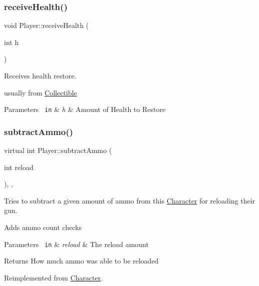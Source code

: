 \subsubsection{\texorpdfstring{receiveHealth()}{receiveHealth()}}
{\footnotesize\ttfamily void Player\+::receive\+Health (\begin{DoxyParamCaption}\item[{int}]{h }\end{DoxyParamCaption})}



Receives health restore. 

usually from \mbox{\hyperlink{class_collectible}{Collectible}}


\begin{DoxyParams}[1]{Parameters}
\mbox{\texttt{ in}}  & {\em h} & Amount of Health to Restore \\
\hline
\end{DoxyParams}
\mbox{\label{class_player_aeadfd36dc48aea300e4925b8c8f3bd3f}} 
\subsubsection{\texorpdfstring{subtractAmmo()}{subtractAmmo()}}
{\footnotesize\ttfamily virtual int Player\+::subtract\+Ammo (\begin{DoxyParamCaption}\item[{int}]{reload }\end{DoxyParamCaption})\hspace{0.3cm}{\ttfamily [inline]}, {\ttfamily [override]}, {\ttfamily [virtual]}}



Tries to subtract a given amount of ammo from this \mbox{\hyperlink{class_character}{Character}} for reloading their gun. 

Adds ammo count checks


\begin{DoxyParams}[1]{Parameters}
\mbox{\texttt{ in}}  & {\em reload} & The reload amount\\
\hline
\end{DoxyParams}
\begin{DoxyReturn}{Returns}
How much ammo was able to be reloaded 
\end{DoxyReturn}


Reimplemented from \mbox{\hyperlink{class_character_a0b36bcc9509ec1e5d7b6902675edc8f2}{Character}}.

